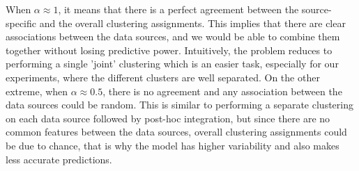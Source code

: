 When $\alpha \approx 1$, it means that there is a perfect agreement between the source-specific and the overall clustering assignments. This implies that there are clear associations between the data sources, and we would be able to combine them together without losing predictive power. Intuitively, the problem reduces to performing a single 'joint' clustering which is an easier task, especially for our experiments, where the different clusters are well separated. On the other extreme, when $\alpha \approx 0.5$, there is no agreement and any association between the data sources could be random. This is similar to performing a separate clustering on each data source followed by post-hoc integration, but since there are no common features between the data sources, overall clustering assignments could be due to chance, that is why the model has higher variability and also makes less accurate predictions. 